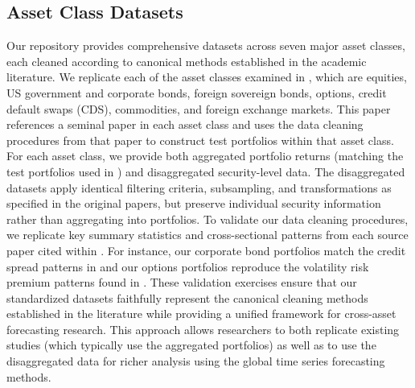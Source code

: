 \documentclass{article}
\begin{document}


\subsection{Asset Class Datasets}
Our repository provides comprehensive datasets across seven major asset classes, each cleaned according to canonical methods established in the academic literature. We replicate each of the asset classes examined in \cite{He2017}, which are equities, US government and corporate bonds, foreign sovereign bonds, options, credit default swaps (CDS), commodities, and foreign exchange markets. 
This paper references a seminal paper in each asset class 
and uses the data cleaning procedures from that paper to construct test portfolios within that asset class.
For each asset class, we provide both aggregated portfolio returns (matching the test portfolios used in \cite{He2017}) and disaggregated security-level data. The disaggregated datasets apply identical filtering criteria, subsampling, and transformations as specified in the original papers, but preserve individual security information rather than aggregating into portfolios. 
To validate our data cleaning procedures, we replicate key summary statistics and cross-sectional patterns from each source paper cited within \cite{He2017}. For instance, our corporate bond portfolios match the credit spread patterns in \cite{Nozawa2017} and our options portfolios reproduce the volatility risk premium patterns found in \cite{Constantinides2013}. These validation exercises ensure that our standardized datasets faithfully represent the canonical cleaning methods established in the literature while providing a unified framework for cross-asset forecasting research. This approach allows researchers to both replicate existing studies (which typically use the aggregated portfolios) as well as to use the disaggregated data for richer analysis using the global time
series forecasting methods.
\end{document}
